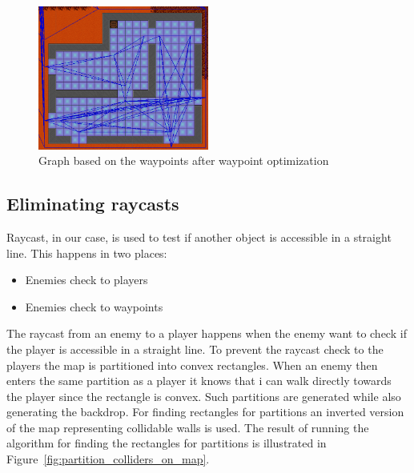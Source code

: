 \begin{figure}[H]
	\includegraphics[width=0.5\textwidth]{figures/astar/optimizedWaypointsGraph}
	\caption{Graph based on the waypoints after waypoint optimization}
	\label{waypointgraphOpt}
\end{figure}

\subsection*{Eliminating raycasts}
Raycast, in our case, is used to test if another object is accessible in a straight line.
This happens in two places:
\begin{itemize}
\item Enemies check to players
\item Enemies check to waypoints
\end{itemize}
The raycast from an enemy to a player happens when the enemy want to check if the player is accessible in a straight line.
To prevent the raycast check to the players the map is partitioned into convex rectangles.
When an enemy then enters the same partition as a player it knows that i can walk directly towards the player since the rectangle is convex.
Such partitions are generated while also generating the backdrop.
For finding rectangles for partitions an inverted version of the map representing collidable walls is used. 
The result of running the algorithm for finding the rectangles for partitions is illustrated in Figure~\ref{fig:partition_colliders_on_map}.

